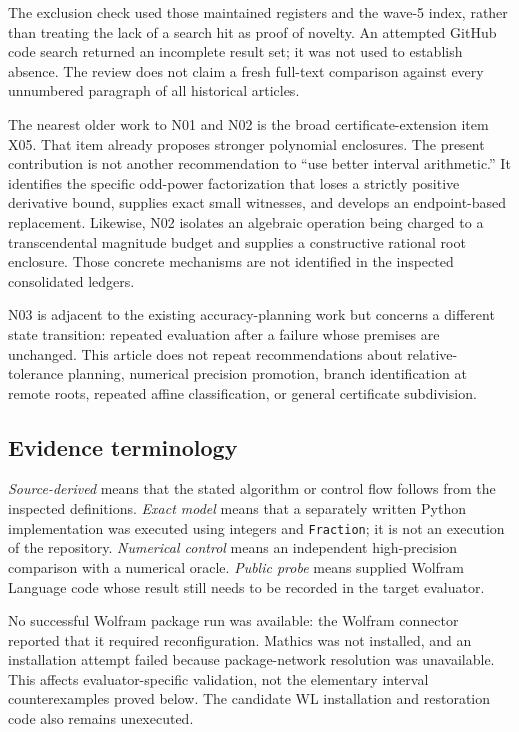 \documentclass[11pt,a4paper]{article}
\newcommand{\code}[1]{\nolinkurl{#1}}
\begin{document}
The exclusion check used those maintained registers and the wave-5 index, rather than treating the lack of a search hit as proof of novelty. An attempted GitHub code search returned an incomplete result set; it was not used to establish absence. The review does not claim a fresh full-text comparison against every unnumbered paragraph of all historical articles.

The nearest older work to N01 and N02 is the broad certificate-extension item X05. That item already proposes stronger polynomial enclosures. The present contribution is not another recommendation to ``use better interval arithmetic.'' It identifies the specific odd-power factorization that loses a strictly positive derivative bound, supplies exact small witnesses, and develops an endpoint-based replacement. Likewise, N02 isolates an algebraic operation being charged to a transcendental magnitude budget and supplies a constructive rational root enclosure. Those concrete mechanisms are not identified in the inspected consolidated ledgers.

N03 is adjacent to the existing accuracy-planning work but concerns a different state transition: repeated evaluation after a failure whose premises are unchanged. This article does not repeat recommendations about relative-tolerance planning, numerical precision promotion, branch identification at remote roots, repeated affine classification, or general certificate subdivision.

\subsection{Evidence terminology}

\emph{Source-derived} means that the stated algorithm or control flow follows from the inspected definitions. \emph{Exact model} means that a separately written Python implementation was executed using integers and \code{Fraction}; it is not an execution of the repository. \emph{Numerical control} means an independent high-precision comparison with a numerical oracle. \emph{Public probe} means supplied Wolfram Language code whose result still needs to be recorded in the target evaluator.

No successful Wolfram package run was available: the Wolfram connector reported that it required reconfiguration. Mathics was not installed, and an installation attempt failed because package-network resolution was unavailable. This affects evaluator-specific validation, not the elementary interval counterexamples proved below. The candidate WL installation and restoration code also remains unexecuted.
\end{document}
